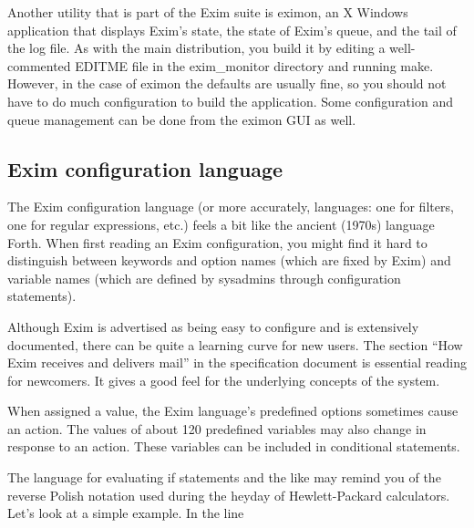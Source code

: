 Another utility that is part of the Exim suite is
\protect\hypertarget{part0026_split_043.htmlux5cux23_idIndexMarker2639}{}{}{eximon},
an X Windows application that displays Exim's state, the state of Exim's
queue, and the tail of the log file. As with the main distribution, you
build it by editing a well-commented {EDITME} file in the
{exim\_monitor} directory and running {make}. However, in the case of
{eximon} the defaults are usually fine, so you should not have to do
much configuration to build the application. Some configuration and
queue management can be done from the {eximon} GUI as well.

\protect\hypertarget{part0026_split_044.html}{}{}

\hypertarget{part0026_split_044.htmlux5cux23_idContainer1247}{}
\hypertarget{part0026_split_044.htmlux5cux23calibre_pb_43}{%
\subsection[Exim configuration
language]{\texorpdfstring{\protect\hypertarget{part0026_split_044.htmlux5cux23_idTextAnchor1133}{}{}\protect\hypertarget{part0026_split_044.htmlux5cux23_idIndexMarker2640}{}{}E\protect\hypertarget{part0026_split_044.htmlux5cux23_idTextAnchor1134}{}{}xim
configuration
language}{Exim configuration language}}\label{part0026_split_044.htmlux5cux23calibre_pb_43}}

The Exim configuration language (or more accurately, languages: one for
filters, one for regular expressions, etc.) feels a bit like the ancient
(1970s) language Forth. When first reading an Exim configuration, you
might find it hard to distinguish between keywords and option names
(which are fixed by Exim) and variable names (which are defined by
sysadmins through configuration statements).

Although Exim is advertised as being easy to configure and is
extensively documented, there can be quite a learning curve for new
users. The section ``How Exim receives and delivers mail'' in the
specification document is essential reading for newcomers. It gives a
good feel for the underlying concepts of the system.

When assigned a value, the Exim language's predefined options sometimes
cause an action. The values of about 120 predefined variables may also
change in response to an action. These variables can be included in
conditional statements.

The language for evaluating {if} statements and the like may remind you
of the reverse Polish notation used during the heyday of Hewlett-Packard
calculators. Let's look at a simple example. In the line

